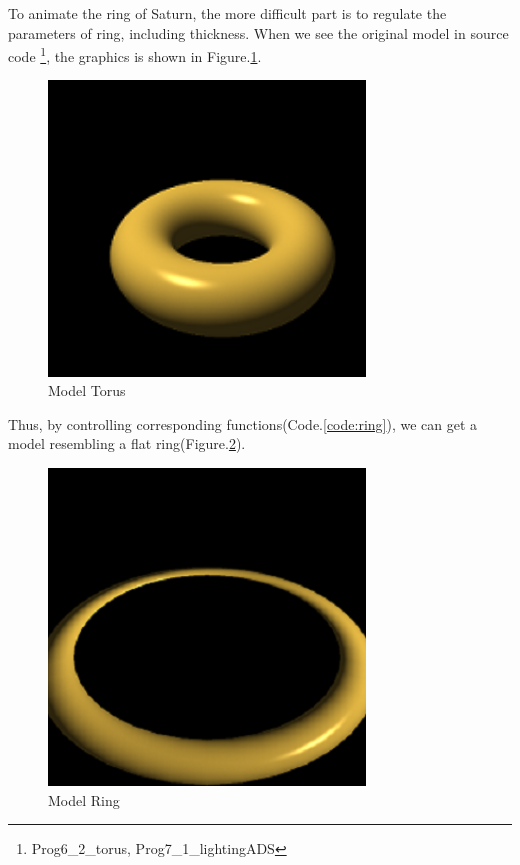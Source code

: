 \documentclass[12pt]{article}
\numberwithin{figure}{subsection}
\numberwithin{table}{subsection}
\numberwithin{equation}{subsection}
\begin{document}
To animate the ring of Saturn, the more difficult part is to regulate the parameters of ring,
including thickness. When we see the original model in source code
\footnote{Prog6\_2\_torus, Prog7\_1\_lightingADS}, the graphics is shown in Figure.\ref{fig:tor}.   
\begin{figure}[!htbp]
	\centering
	\includegraphics[width=0.75\textwidth]{image/torus.png}
	\caption{Model Torus}
    \label{fig:tor}
\end{figure}

Thus, by controlling corresponding functions(Code.\ref{code:ring}), we can get a model resembling a flat ring(Figure.\ref{fig:torring}). 
\label{code:ring}

\begin{figure}[!htbp]
	\centering
	\includegraphics[width=0.75\textwidth]{image/torus ring.png}
	\caption{Model Ring}
    \label{fig:torring}
\end{figure}
\end{document}
